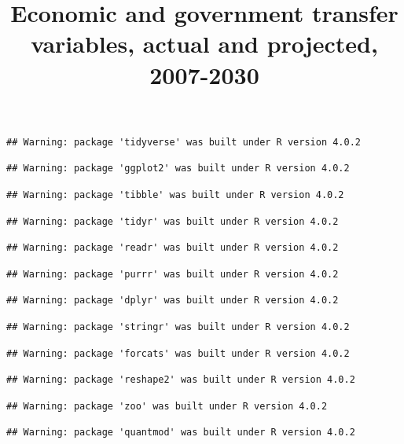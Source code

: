 \documentclass[
]{article}
\title{Economic and government transfer variables, actual and projected,
2007-2030}
\author{}
\date{\vspace{-2.5em}}
\begin{document}
\maketitle

\begin{verbatim}
## Warning: package 'tidyverse' was built under R version 4.0.2
\end{verbatim}

\begin{verbatim}
## Warning: package 'ggplot2' was built under R version 4.0.2
\end{verbatim}

\begin{verbatim}
## Warning: package 'tibble' was built under R version 4.0.2
\end{verbatim}

\begin{verbatim}
## Warning: package 'tidyr' was built under R version 4.0.2
\end{verbatim}

\begin{verbatim}
## Warning: package 'readr' was built under R version 4.0.2
\end{verbatim}

\begin{verbatim}
## Warning: package 'purrr' was built under R version 4.0.2
\end{verbatim}

\begin{verbatim}
## Warning: package 'dplyr' was built under R version 4.0.2
\end{verbatim}

\begin{verbatim}
## Warning: package 'stringr' was built under R version 4.0.2
\end{verbatim}

\begin{verbatim}
## Warning: package 'forcats' was built under R version 4.0.2
\end{verbatim}

\begin{verbatim}
## Warning: package 'reshape2' was built under R version 4.0.2
\end{verbatim}

\begin{verbatim}
## Warning: package 'zoo' was built under R version 4.0.2
\end{verbatim}

\begin{verbatim}
## Warning: package 'quantmod' was built under R version 4.0.2
\end{verbatim}
\end{document}
